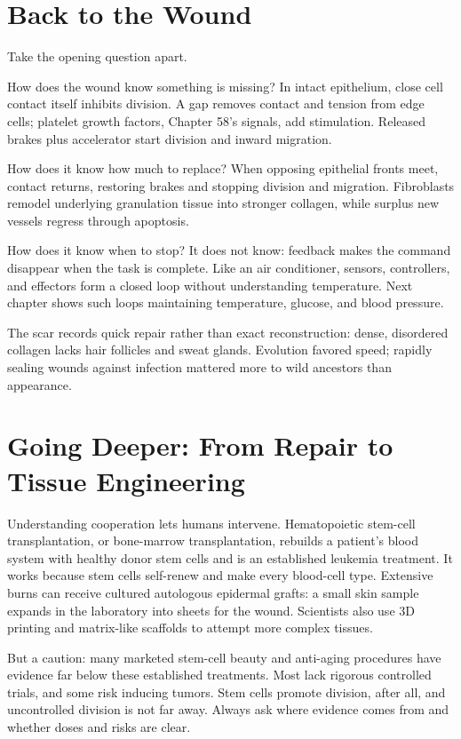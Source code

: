 \section{Back to the Wound}

Take the opening question apart.

How does the wound know something is missing? In intact epithelium, close cell contact itself inhibits division. A gap removes contact and tension from edge cells; platelet growth factors, Chapter 58's signals, add stimulation. Released brakes plus accelerator start division and inward migration.

How does it know how much to replace? When opposing epithelial fronts meet, contact returns, restoring brakes and stopping division and migration. Fibroblasts remodel underlying granulation tissue into stronger collagen, while surplus new vessels regress through apoptosis.

How does it know when to stop? It does not know: feedback makes the command disappear when the task is complete. Like an air conditioner, sensors, controllers, and effectors form a closed loop without understanding temperature. Next chapter shows such loops maintaining temperature, glucose, and blood pressure.

The scar records quick repair rather than exact reconstruction: dense, disordered collagen lacks hair follicles and sweat glands. Evolution favored speed; rapidly sealing wounds against infection mattered more to wild ancestors than appearance.

\section{Going Deeper: From Repair to Tissue Engineering}

Understanding cooperation lets humans intervene. Hematopoietic stem-cell transplantation, or bone-marrow transplantation, rebuilds a patient's blood system with healthy donor stem cells and is an established leukemia treatment. It works because stem cells self-renew and make every blood-cell type. Extensive burns can receive cultured autologous epidermal grafts: a small skin sample expands in the laboratory into sheets for the wound. Scientists also use 3D printing and matrix-like scaffolds to attempt more complex tissues.

But a caution: many marketed stem-cell beauty and anti-aging procedures have evidence far below these established treatments. Most lack rigorous controlled trials, and some risk inducing tumors. Stem cells promote division, after all, and uncontrolled division is not far away. Always ask where evidence comes from and whether doses and risks are clear.

